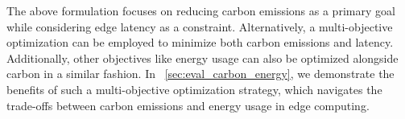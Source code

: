 
 
 The above formulation focuses on reducing carbon emissions as a primary goal while considering edge latency as a constraint. Alternatively, a multi-objective optimization can be employed to minimize both carbon emissions and latency. Additionally, other objectives like energy usage can also be optimized alongside carbon in a similar fashion. In ~\autoref{sec:eval_carbon_energy}, we  demonstrate the benefits of such a multi-objective optimization strategy, which navigates the trade-offs between carbon emissions and energy usage in edge computing.




